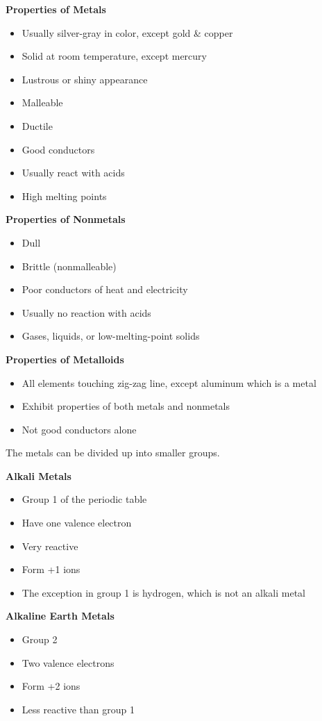 \documentclass[../hchem.tex]{subfiles}
\begin{document}
\textbf{Properties of Metals}
\begin{itemize}
    \item Usually silver-gray in color, except gold \& copper 
    \item Solid at room temperature, except mercury
    \item Lustrous or shiny appearance 
    \item Malleable
    \item Ductile
    \item Good conductors
    \item Usually react with acids 
    \item High melting points
\end{itemize}

\textbf{Properties of Nonmetals}
\begin{itemize}
    \item Dull
    \item Brittle (nonmalleable)
    \item Poor conductors of heat and electricity
    \item Usually no reaction with acids 
    \item Gases, liquids, or low-melting-point solids 
\end{itemize}

\textbf{Properties of Metalloids}
\begin{itemize}
    \item All elements touching zig-zag line, except aluminum which is a metal 
    \item Exhibit properties of both metals and nonmetals 
    \item Not good conductors alone
\end{itemize}

The metals can be divided up into smaller groups.

\textbf{Alkali Metals}
\begin{itemize}
    \item Group 1 of the periodic table 
    \item Have one valence electron
    \item Very reactive
    \item Form +1 ions 
    \item The exception in group 1 is hydrogen, which is not an alkali metal 
\end{itemize}

\textbf{Alkaline Earth Metals}
\begin{itemize}
    \item Group 2
    \item Two valence electrons
    \item Form +2 ions 
    \item Less reactive than group 1
\end{itemize}
\end{document}
